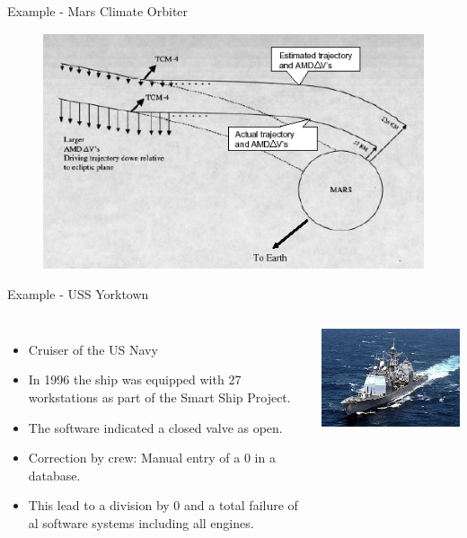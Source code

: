 \begin{frame}{Example - Mars Climate Orbiter}
\begin{figure}
\centering
\includegraphics[width=\textwidth]{content/images/software-quality/mco_trajectory.jpg}
\end{figure} 
\end{frame}


\begin{frame}{Example - USS Yorktown}
\begin{columns}
\begin{itemize}
	\item Cruiser of the US Navy
	\item In 1996 the ship was equipped with 27 workstations as part of the Smart Ship Project.
	\item The software indicated a closed valve as open.
	\item Correction by crew: Manual entry of a $0$ in a database.
	\item This lead to a division by $0$ and a total failure of al software systems including all engines.
\end{itemize}
\centering
\includegraphics[width=\textwidth]{content/images/software-quality/yorktown.jpg}
\end{columns} 
\end{frame}




